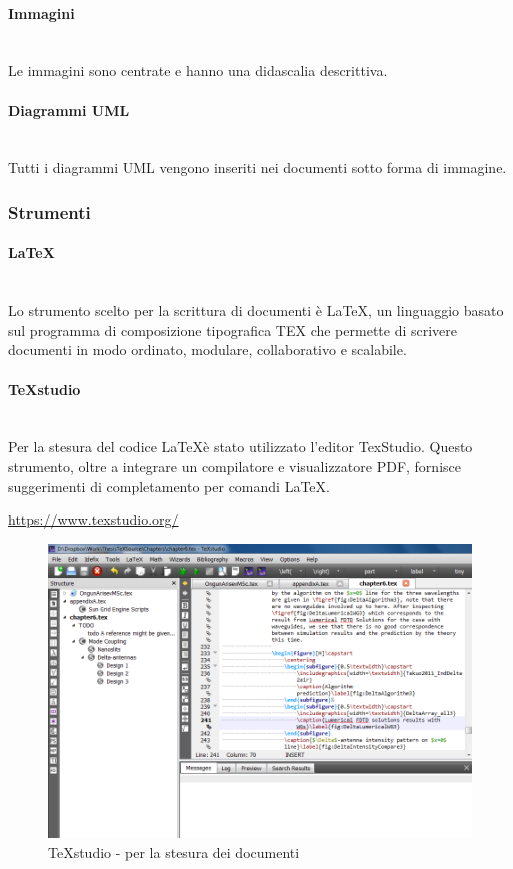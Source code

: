 		\paragraph{Immagini} \mbox{}\\
		Le immagini sono centrate e hanno una didascalia descrittiva. 
		\paragraph{Diagrammi UML} \mbox{}\\
		Tutti i diagrammi UML vengono inseriti nei documenti sotto forma di immagine.
	\subsubsection{Strumenti}
		\paragraph{\LaTeX} \mbox{}\\
		Lo strumento scelto per la scrittura di documenti è \LaTeX, un linguaggio basato sul programma di composizione tipografica TEX che permette di scrivere documenti in modo ordinato, modulare, collaborativo e scalabile.
		\paragraph{TeXstudio} \mbox{}\\
		Per la stesura del codice \LaTeX è stato utilizzato l'editor TexStudio. Questo strumento, oltre a integrare un compilatore e visualizzatore PDF, fornisce suggerimenti di completamento per comandi \LaTeX{}. \newline
		\centerline{\url{https://www.texstudio.org/}}
		\begin{figure}[H]
			\includegraphics[width=0.99\linewidth]{res/images/latex.jpg}
			\caption{TeXstudio - per la stesura dei documenti}
		\end{figure} 
